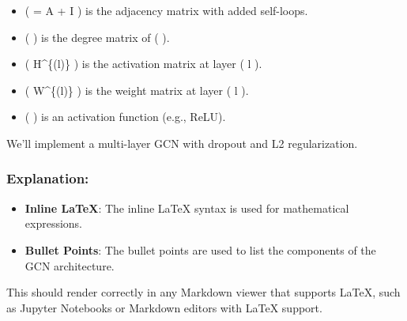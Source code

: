 \documentclass[11pt]{article}
\providecommand{\tightlist}{%
      \setlength{\itemsep}{0pt}\setlength{\parskip}{0pt}}
\begin{document}
\begin{itemize}
\tightlist
\item
  (  = A + I ) is the adjacency matrix with added self-loops.
\item
  (  ) is the degree matrix of (  ).
\item
  ( H\^{}\{(l)\} ) is the activation matrix at layer ( l ).
\item
  ( W\^{}\{(l)\} ) is the weight matrix at layer ( l ).
\item
  ( \sigma ) is an activation function (e.g., ReLU).
\end{itemize}

We'll implement a multi-layer GCN with dropout and L2 regularization.

\subsubsection{Explanation:}\label{explanation}

\begin{itemize}
\tightlist
\item
  \textbf{Inline LaTeX}: The inline LaTeX syntax is used for
  mathematical expressions.
\item
  \textbf{Bullet Points}: The bullet points are used to list the
  components of the GCN architecture.
\end{itemize}

This should render correctly in any Markdown viewer that supports LaTeX,
such as Jupyter Notebooks or Markdown editors with LaTeX support.
\end{document}
